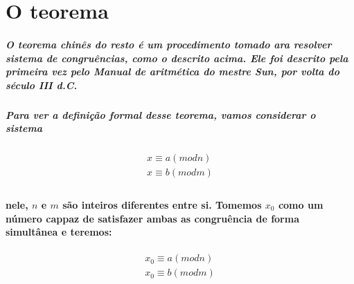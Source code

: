 \section{O teorema}

\subparagraph{
O teorema chin\^es do resto \'e um procedimento tomado ara resolver sistema de congru\^encias, como o descrito acima. Ele foi descrito pela primeira vez pelo Manual de aritm\'etica do mestre Sun, por volta do s\'eculo III d.C. 
}
\subparagraph{
Para ver a defini\c{c}\~ao formal desse teorema, vamos considerar o sistema
}
\[	
	\begin{array}{c}
		\textit{$x \equiv a (mod n)$}\\
		\textit{$x \equiv b (mod m)$}\\
	\end{array}
\]
\paragraph{
nele, $n$ e $m$ s\~ao inteiros diferentes entre si. Tomemos $x_0$ como um n\'umero cappaz de satisfazer ambas as congru\^encia de forma simult\^anea e teremos:
}
\[	
	\begin{array}{c}
		\textit{$x_0 \equiv a (mod n)$}\\
		\textit{$x_0 \equiv b (mod m)$}\\
	\end{array}
\]